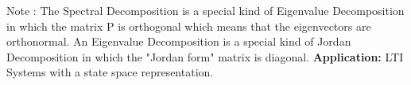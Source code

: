 \documentclass[]{finalproject}
\begin{document}
\begin{flushleft}

Note : The Spectral Decomposition is a special kind of Eigenvalue Decomposition in which the matrix P is orthogonal which means that the eigenvectors are orthonormal. 
An Eigenvalue Decomposition is a special kind of Jordan Decomposition in which the "Jordan form" matrix is diagonal. \cite{jordan} \newline
\textbf{Application:} LTI Systems with a state space representation. \cite{jordan_application} \newline

\begin{comment}
Matrix exponential, $ e^{tM} $,where M is n×n, is a state transition matrix for LTI systems with a state space representation. The matrix exponential was defined as follows: \newline
$ e^{tM} = I + \sum_{k=1}^{\infty} \dfrac{t^{k}M^{k}}{k!} = I + tM + \dfrac{t^{2}M^{2}}{2!} + .... + \dfrac{t^{k}M^{k}}{k!} + ... $ \newline
When the n × n matrix M is diagonalizable, $ e^{tM} $ becomes particularly easy to evaluate, then we will use the features of Spectral Decomposition;\newline
$ (M)^{k} = (P * D * P^{-1})^{k} $ =  $ P * D^{k} * P^{-1} $  substituting into the series expansion; 
$ e^{tM} = P( I+ tD +  \dfrac{t^{2}D^{2}}{2!} + .... + \dfrac{t^{k}D^{k}}{k!} + ... )P^{-1} $ Now using the definition of the function $ e^{x} $ as power series: $ e^{x} = \sum_{k=0}^{\infty} \dfrac{x^{k}}{k!} $ we have that
 $ e^{tM} = P
 \begin{bmatrix} 
e^{t\lambda_{1}} & & &  \\
 &e^{t\lambda_{2}} & & \\
 & &\ddots & \\
& & &&e^{t\lambda_{n}}
\end{bmatrix} P^{-1}$
\end{comment}



\end{flushleft}
\end{document}
